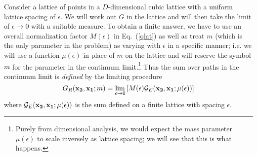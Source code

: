 \documentclass[12pt]{article}
\def\eq#1{{Eq.~(\ref{#1})}}
\begin{document}
Consider a lattice of points in a $D$-dimensional cubic lattice with a uniform
lattice spacing of $\epsilon$. We will work out $G$ in the 
lattice and will then take the limit of $\epsilon\to 0$
with a suitable measure. To obtain a finite answer, we have to use an overall normalization factor $M(\epsilon)$ in \eq{qlat} as well as 
treat $m$ (which is the only parameter in the problem)
as varying with $\epsilon$  in a specific manner; i.e. we will use a function $\mu(\epsilon)$ in place of $m$ on the lattice
and will  reserve the symbol $m$  for the parameter in the continuum limit.\footnote{Purely from dimensional analysis, we would expect the mass parameter $\mu(\epsilon)$ to scale inversely as lattice spacing;  we will see that this is what happens.}  Thus the sum over paths in the continuum limit is \textit{defined} by the limiting procedure
\begin{equation} 
G_R(\mathbf{ x_2,x_1};m)=
\lim_{\epsilon\to 0}
\left[M(\epsilon){\cal G}_E(\mathbf{ x_2, x_1};
\mu(\epsilon))\right]  
\end{equation} 
where ${\cal G}_E(\mathbf{ x_2, x_1};\mu(\epsilon))$ is the sum defined on a finite lattice with spacing $\epsilon$.
\end{document}
